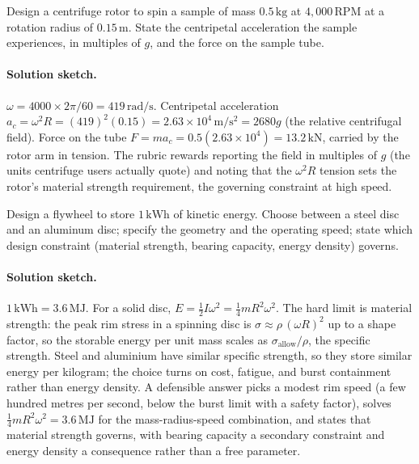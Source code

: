 \begin{exercise}
Design a centrifuge rotor to spin a sample of mass $0.5\,\si{\kilogram}$
at $4{,}000\,\text{RPM}$ at a rotation radius of $0.15\,\si{\meter}$.
State the centripetal acceleration the sample experiences, in
multiples of $g$, and the force on the sample tube.
\paragraph{Solution sketch.} $\omega=4000\times 2\pi/60=419\,\si{
\radian\per\second}$. Centripetal acceleration $a_{c}=\omega^{2}R=
(419)^{2}(0.15)=2.63\times 10^{4}\,\si{\meter\per\second\squared}=
2680g$ (the relative centrifugal field). Force on the tube $F=ma_{c}=
0.5(2.63\times 10^{4})=13.2\,\si{\kilo\newton}$, carried by the rotor
arm in tension. The rubric rewards reporting the field in multiples of
$g$ (the units centrifuge users actually quote) and noting that the
$\omega^{2}R$ tension sets the rotor's material strength requirement,
the governing constraint at high speed.
\end{exercise}

\begin{exercise}
Design a flywheel to store $1\,\text{kWh}$ of kinetic energy.
Choose between a steel disc and an aluminum disc; specify the
geometry and the operating speed; state which design constraint
(material strength, bearing capacity, energy density) governs.
\paragraph{Solution sketch.} $1\,\text{kWh}=3.6\,\si{\mega\joule}$.
For a solid disc, $E=\tfrac{1}{2}I\omega^{2}=\tfrac{1}{4}mR^{2}
\omega^{2}$. The hard limit is material strength: the peak rim stress
in a spinning disc is $\sigma\approx\rho\,(\omega R)^{2}$ up to a
shape factor, so the storable energy per unit mass scales as
$\sigma_{\text{allow}}/\rho$, the specific strength. Steel and
aluminium have similar specific strength, so they store similar
energy per kilogram; the choice turns on cost, fatigue, and burst
containment rather than energy density. A defensible answer picks a
modest rim speed (a few hundred metres per second, below the burst
limit with a safety factor), solves $\tfrac{1}{4}mR^{2}\omega^{2}=
3.6\,\si{\mega\joule}$ for the mass-radius-speed combination, and
states that material strength governs, with bearing capacity a
secondary constraint and energy density a consequence rather than a
free parameter.
\end{exercise}

